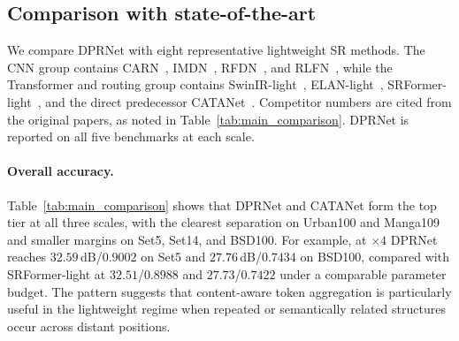 \subsection{Comparison with state-of-the-art}
\label{sec:main_comparison}

We compare DPRNet with eight representative lightweight SR methods. The CNN group
contains CARN~\cite{ahn2018carn}, IMDN~\cite{hui2019imdn}, RFDN~\cite{liu2020rfdn},
and RLFN~\cite{kong2022rlfn}, while the Transformer and routing group contains
SwinIR-light~\cite{liang2021swinir}, ELAN-light~\cite{zhang2022elan},
SRFormer-light~\cite{zhou2023srformer}, and the direct predecessor
CATANet~\cite{liu2025catanet}. Competitor numbers are cited from the original
papers, as noted in Table~\ref{tab:main_comparison}. DPRNet is reported on all
five benchmarks at each scale.

\paragraph{Overall accuracy.}
Table~\ref{tab:main_comparison} shows that DPRNet and CATANet form the top tier at
all three scales, with the clearest separation on Urban100 and Manga109 and
smaller margins on Set5, Set14, and BSD100. For example, at $\times4$ DPRNet
reaches $32.59$\,dB/$0.9002$ on Set5 and $27.76$\,dB/$0.7434$ on BSD100, compared with
SRFormer-light at $32.51$/$0.8988$ and $27.73$/$0.7422$ under a comparable
parameter budget. The pattern suggests that content-aware token aggregation is
particularly useful in the lightweight regime when repeated or semantically related
structures occur across distant positions.

